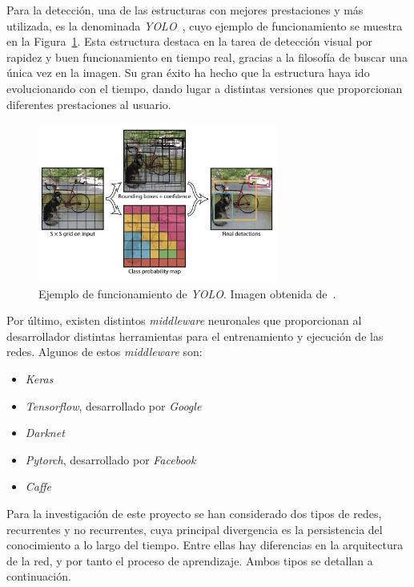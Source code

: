 Para la detección, una de las estructuras con mejores prestaciones y más utilizada, es la denominada \textit{YOLO}~\cite{Redmon2016YouOL}, cuyo ejemplo de funcionamiento se muestra en la Figura~\ref{fig.yolo}. Esta estructura destaca en la tarea de detección visual por rapidez y buen funcionamiento en tiempo real, gracias a la filosofía de buscar una única vez en la imagen. Su gran éxito ha hecho que la estructura haya ido evolucionando con el tiempo, dando lugar a distintas versiones que proporcionan diferentes prestaciones al usuario.

\vspace{10pt}
\begin{figure}[H]
		\begin{center}
			\includegraphics[width=0.7\textwidth]{ figures/intro/yolo.png}
			\caption{Ejemplo de funcionamiento de \textit{YOLO}. Imagen obtenida de~\cite{Redmon2016YouOL}.}
			\label{fig.yolo}
		\end{center}
\end{figure}
\vspace{-10pt}


Por último, existen distintos \textit{middleware} neuronales que proporcionan al desarrollador distintas herramientas para el entrenamiento y ejecución de las redes. Algunos de estos \textit{middleware} son:

\begin{itemize}
    \item \textit{Keras}
    \item \textit{Tensorflow}, desarrollado por \textit{Google}
    \item \textit{Darknet}
    \item \textit{Pytorch}, desarrollado por \textit{Facebook}
    \item \textit{Caffe}
\end{itemize}


Para la investigación de este proyecto se han considerado dos tipos de redes, recurrentes y no recurrentes, cuya principal divergencia es la persistencia del conocimiento a lo largo del tiempo. Entre ellas hay diferencias en la arquitectura de la red, y por tanto el proceso de aprendizaje. Ambos tipos se detallan a continuación.

